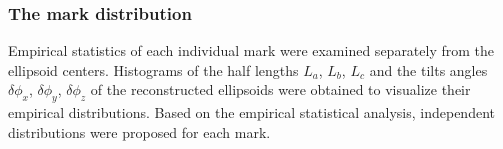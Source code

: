 \documentclass[journal]{IEEEtran}
\begin{document}
\subsubsection{The mark distribution}
\label{sec:mark-distribution}

Empirical statistics of each individual mark were examined separately
from the ellipsoid centers. Histograms of the half lengths $L_a$,
$L_b$, $L_c$ and the tilts angles $\delta\phi_x$, $\delta\phi_y$,
$\delta\phi_z$ of the reconstructed ellipsoids were obtained to
visualize their empirical distributions. Based on the empirical
statistical analysis, independent distributions were proposed for each
mark.


\end{document}
